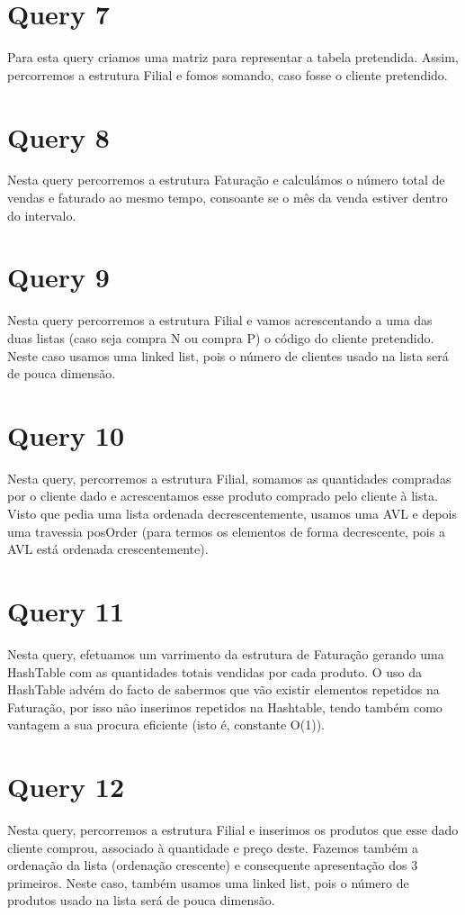 \documentclass[a4paper,11pt]{report}
\begin{document}
\section*{Query 7}
Para esta query criamos uma matriz para representar a tabela pretendida. Assim, percorremos a estrutura Filial e fomos somando, caso fosse o cliente pretendido.

\section*{Query 8}
Nesta query percorremos a estrutura Faturação e calculámos o número total de vendas e faturado ao mesmo tempo, consoante se o mês da venda estiver dentro do intervalo.

\section*{Query 9}
Nesta query percorremos a estrutura Filial e vamos acrescentando a uma das duas listas (caso seja compra N ou compra P) o código do cliente pretendido. Neste caso usamos uma linked list, pois o número de clientes usado na lista será de pouca dimensão.

\section*{Query 10}
Nesta query, percorremos a estrutura Filial, somamos as quantidades compradas por o cliente dado e acrescentamos esse produto comprado pelo cliente à lista. Visto que pedia uma lista ordenada decrescentemente, usamos uma AVL e depois uma travessia posOrder (para termos os elementos de forma decrescente, pois a AVL está ordenada crescentemente).

\section*{Query 11}
Nesta query, efetuamos um varrimento da estrutura de Faturação gerando uma HashTable com as quantidades totais vendidas por cada produto. O uso da HashTable advém do facto de sabermos que vão existir elementos repetidos na Faturação, por isso não inserimos repetidos na Hashtable, tendo também como vantagem a sua procura eficiente (isto é, constante O(1)).


\section*{Query 12}
Nesta query, percorremos a estrutura Filial e inserimos os produtos que esse dado cliente comprou, associado à quantidade e preço deste. Fazemos também a ordenação da lista (ordenação crescente) e consequente apresentação dos 3 primeiros. Neste caso, também usamos uma linked list, pois o número de produtos usado na lista será de pouca dimensão.
\end{document}
